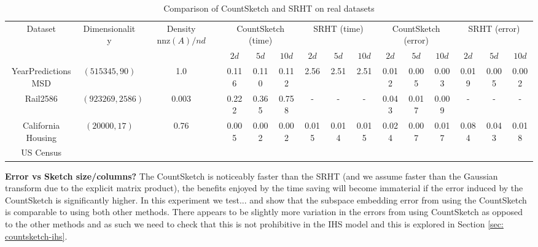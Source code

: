 \documentclass[twoside]{article}
\newcommand{\nnz}[1]{\text{nnz}(#1)}
\theoremstyle{definition}\newtheorem{thm}{Theorem}[section]
\theoremstyle{definition}\newtheorem{mydef}[thm]{Definition}
\theoremstyle{definition}\newtheorem{rem}[thm]{Remark}
\theoremstyle{definition}\newtheorem{prop}[thm]{Proposition}
\theoremstyle{definition}\newtheorem{example}[thm]{Example}
\theoremstyle{definition}\newtheorem{claim}[thm]{Claim}
\theoremstyle{definition}\newtheorem{Qu}[thm]{Question}
\theoremstyle{definition}\newtheorem{Lemma}[thm]{Lemma}
\theoremstyle{definition}\newtheorem{Cor}[thm]{Corollary}
\theoremstyle{definition}\newtheorem{Fact}[]{Fact}
\begin{document}
%
\begin{table}[ht]
\centering
\begin{adjustbox}{width=1\textwidth}

\begin{tabular}{|c|c|c|c|c|c|c|c|c|c|c|c|c|c|c|}
  \hline
\multirow{2}{*}{Dataset} & \multirow{2}{*}{Dimensionality} & \multirow{2}{*}{Density $\nnz{A}/nd$} & \multicolumn{3}{c|}{CountSketch (time)} & \multicolumn{3}{c}{SRHT (time)} & \multicolumn{3}{c|}{CountSketch (error)} & \multicolumn{3}{c|}{SRHT (error)} \\
                         &                                 &                          & $2d$          & $5d$         & $10d$         & $2d$        & $5d$       & $10d$       & $2d$          & $5d$          & $10d$          & $2d$        & $5d$        & $10d$       \\
\hline
YearPredictionsMSD       & $(515345,90)$                                &  1.0                        &    0.116         &   0.110          &  0.112          &  2.56         &  2.51        &   2.51        &  0.012           &   0.005          &    0.003           &   0.019        &   0.005        &  0.002         \\
Rail2586                 &   $(923269, 2586)$                             &   0.003                       &  0.222           &  0.365           &  0.758             &  -         & -         & -           & 0.043             &  0.017             &  0.009            & -          & -           & -           \\
California Housing       &  $(20000, 17)$                               &    0.76                      &   0.005          &  0.002           &   0.002          &  0.015         &  0.014        & 0.015          &   0.024          &  0.007           & 0.017       & 0.084          & 0.043         & 0.018 \\
US Census     &                       &            &            &           &          &      &         &            &            &              &         &          &        \\
\hline
\end{tabular}
\end{adjustbox}
\caption{Comparison of CountSketch and SRHT on real datasets}
\label{table: real-data-subspace-embedding}
\end{table}

\noindent\textbf{Error vs Sketch size/columns?}
The CountSketch is noticeably faster than the SRHT (and we assume
 faster
than the Gaussian transform due to the explicit matrix product), the benefits
enjoyed by the time saving will become immaterial if the error induced by the
CountSketch is significantly higher.
In this experiment we test... and show that the subspace embedding error from
using the CountSketch is comparable to using both other methods.
There appears to be slightly more variation in the errors from using CountSketch
as opposed to the other methods and as such we need to check that this is not
prohibitive in the IHS model and this is explored in Section
\ref{sec: countsketch-ihs}.
\end{document}

